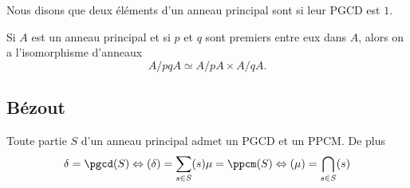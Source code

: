 \begin{definition}      \label{DEFooXSPFooPumQSy}
Nous disons que deux éléments d'un anneau principal sont  si leur PGCD est \( 1\).
\end{definition}

\begin{theorem}        \label{ThofPXwiM}
    Si \( A\) est un anneau principal et si \( p\) et \( q\) sont premiers entre eux dans \( A\), alors on a l'isomorphisme d'anneaux
    \begin{equation}
        A/pqA\simeq A/pA\times A/qA.
    \end{equation}
\end{theorem}

\subsection{Bézout}

\begin{theorem}
    Toute partie \( S\) d'un anneau principal admet un PGCD et un PPCM. De plus
    \begin{equation}
        \begin{aligned}[]
            \delta=\pgcd(S)\Leftrightarrow (\delta)=\sum_{s\in S}(s)
            \mu=\ppcm(S)\Leftrightarrow (\mu)=\bigcap_{s\in S}(s)
        \end{aligned}
    \end{equation}
\end{theorem}

